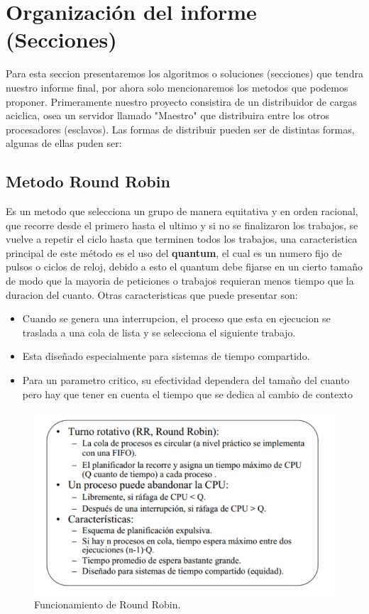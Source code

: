 \documentclass[conference,letterpaper]{IEEEtran}
\begin{document}
\section{Organizaci\'on del informe (Secciones)}
Para esta seccion presentaremos los algoritmos o soluciones (secciones) que tendra nuestro informe final, por ahora solo mencionaremos los metodos que podemos proponer. Primeramente nuestro proyecto consistira de un distribuidor de cargas aciclica, osea un servidor llamado "Maestro" que distribuira entre los otros procesadores (esclavos). Las formas de distribuir pueden ser de distintas formas, algunas de ellas puden ser:

\subsection{Metodo Round Robin}
Es un metodo que selecciona un grupo de manera equitativa y en orden racional, que recorre desde el primero hasta el ultimo y si no se finalizaron los trabajos, se vuelve a repetir el ciclo hasta que terminen todos los trabajos, una caracteristica principal de este m\'etodo es el uso del \textbf{quantum}, el cual es un numero fijo de pulsos o ciclos de reloj, debido a esto el quantum debe fijarse en un cierto tamaño de modo que la mayoria de peticiones o trabajos requieran menos tiempo que la duracion del cuanto. Otras caracteristicas que puede presentar son:

\begin{itemize}
    \item Cuando se genera una interrupcion, el proceso que esta en ejecucion se traslada a una cola de lista y se selecciona el siguiente trabajo.
    \item Esta diseñado especialmente para sistemas de tiempo compartido.
    \item Para un parametro critico, su efectividad dependera del tamaño del cuanto pero hay que tener en cuenta el tiempo que se dedica al cambio de contexto
\end{itemize}

\begin{figure}[thpb]
      \centering
      \includegraphics[width=0.55\linewidth]{rr.png}
      \caption{Funcionamiento de Round Robin.}
      \label{fig:RR}
\end{figure}
\end{document}
